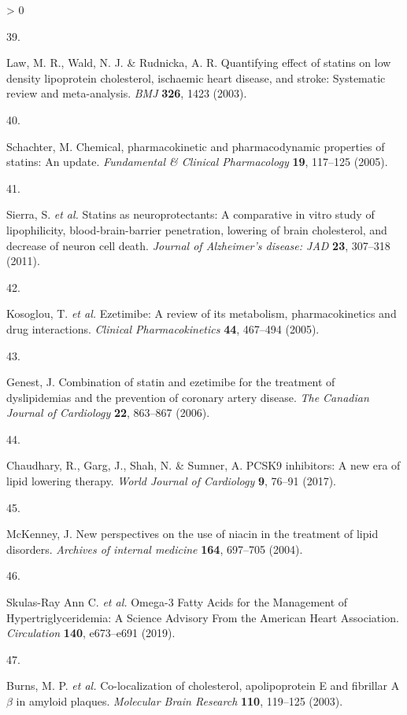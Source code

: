 \documentclass[a4paper, twoside]{templates/ociamthesis}
\newlength{\cslhangindent}
\newlength{\csllabelwidth}
\newenvironment{CSLReferences}[3] %
 {%
  \setlength{\parindent}{0pt}
  \ifodd #1 \everypar{\setlength{\hangindent}{\cslhangindent}}\ignorespaces\fi
  \ifnum #2 > 0
  \setlength{\parskip}{#2\baselineskip}
  \fi
 }%
 {}
\newcommand{\CSLLeftMargin}[1]{\parbox[t]{\maxof{\widthof{#1}}{\csllabelwidth}}{#1}}
\newcommand{\CSLRightInline}[1]{\parbox[t]{\linewidth - \csllabelwidth}{#1}}
\begin{document}
\begin{CSLReferences}{0}{0}
\leavevmode\hypertarget{ref-law2003}{}%
\CSLLeftMargin{39. }
\CSLRightInline{Law, M. R., Wald, N. J. \& Rudnicka, A. R. Quantifying effect of statins on low density lipoprotein cholesterol, ischaemic heart disease, and stroke: Systematic review and meta-analysis. \emph{BMJ} \textbf{326}, 1423 (2003).}

\leavevmode\hypertarget{ref-schachter2005}{}%
\CSLLeftMargin{40. }
\CSLRightInline{Schachter, M. Chemical, pharmacokinetic and pharmacodynamic properties of statins: An update. \emph{Fundamental \& Clinical Pharmacology} \textbf{19}, 117--125 (2005).}

\leavevmode\hypertarget{ref-sierra2011}{}%
\CSLLeftMargin{41. }
\CSLRightInline{Sierra, S. \emph{et al.} Statins as neuroprotectants: A comparative in vitro study of lipophilicity, blood-brain-barrier penetration, lowering of brain cholesterol, and decrease of neuron cell death. \emph{Journal of Alzheimer's disease: JAD} \textbf{23}, 307--318 (2011).}

\leavevmode\hypertarget{ref-kosoglou2005}{}%
\CSLLeftMargin{42. }
\CSLRightInline{Kosoglou, T. \emph{et al.} Ezetimibe: A review of its metabolism, pharmacokinetics and drug interactions. \emph{Clinical Pharmacokinetics} \textbf{44}, 467--494 (2005).}

\leavevmode\hypertarget{ref-genest2006}{}%
\CSLLeftMargin{43. }
\CSLRightInline{Genest, J. Combination of statin and ezetimibe for the treatment of dyslipidemias and the prevention of coronary artery disease. \emph{The Canadian Journal of Cardiology} \textbf{22}, 863--867 (2006).}

\leavevmode\hypertarget{ref-chaudhary2017}{}%
\CSLLeftMargin{44. }
\CSLRightInline{Chaudhary, R., Garg, J., Shah, N. \& Sumner, A. {PCSK9} inhibitors: A new era of lipid lowering therapy. \emph{World Journal of Cardiology} \textbf{9}, 76--91 (2017).}

\leavevmode\hypertarget{ref-mckenney2004}{}%
\CSLLeftMargin{45. }
\CSLRightInline{McKenney, J. New perspectives on the use of niacin in the treatment of lipid disorders. \emph{Archives of internal medicine} \textbf{164}, 697--705 (2004).}

\leavevmode\hypertarget{ref-skulas2019}{}%
\CSLLeftMargin{46. }
\CSLRightInline{Skulas-Ray Ann C. \emph{et al.} Omega-3 {Fatty Acids} for the {Management} of {Hypertriglyceridemia}: A {Science Advisory From} the {American Heart Association}. \emph{Circulation} \textbf{140}, e673--e691 (2019).}

\leavevmode\hypertarget{ref-burns2003}{}%
\CSLLeftMargin{47. }
\CSLRightInline{Burns, M. P. \emph{et al.} Co-localization of cholesterol, apolipoprotein {E} and fibrillar {A\(\beta\)} in amyloid plaques. \emph{Molecular Brain Research} \textbf{110}, 119--125 (2003).}


\end{CSLReferences}
\end{document}
